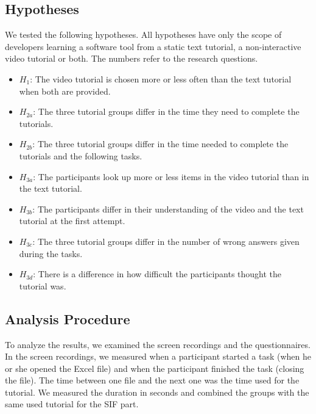 \subsection{Hypotheses}
We tested the following hypotheses. All hypotheses have only the scope of developers learning a software tool from
a static text tutorial, a non-interactive video tutorial or both. The numbers refer to the research questions. 
\begin{itemize}

	\item ${H_1}$: The video tutorial is chosen more or less often than the text tutorial when both are provided.

	\item ${H_{2a}}$: The three tutorial groups differ in the time they need to complete the tutorials.

	\item ${H_{2b}}$: The three tutorial groups differ in the time needed to complete the tutorials and the following tasks.

	\item ${H_{3a}}$: The participants look up more or less items in the video tutorial than in the text tutorial.

	\item ${H_{3b}}$: The participants differ in their understanding of the video and the text tutorial at the first attempt. 

	\item ${H_{3c}}$: The three tutorial groups differ in the number of wrong answers given during the tasks. 

	\item ${H_{3d}}$: There is a difference in how difficult the participants thought the tutorial was.
	
\end{itemize}





\subsection{Analysis Procedure}
\label{sec:analysis_procedure}

To analyze the results, we examined the screen recordings and the questionnaires. In the screen recordings, we measured when a participant started a task (when he or she opened the Excel file) and when the participant finished the task (closing the file). The time between one file and the next one was the time used for the tutorial. We measured the duration in seconds and combined the groups with the same used tutorial for the SIF part.

